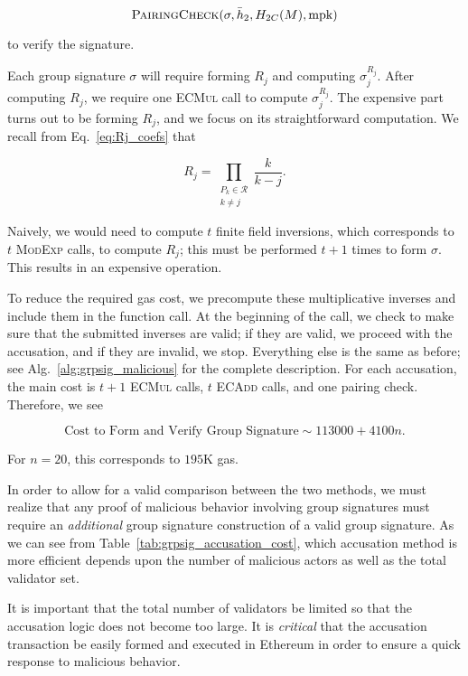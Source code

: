 \begin{equation}
    \textsc{PairingCheck}(\sigma, \bar{h}_{2}, H_{2C}(M), \text{mpk})
\end{equation}

\noindent
to verify the signature.

Each group signature $\sigma$ will require forming $R_{j}$
and computing $\sigma_{j}^{R_{j}}$.
After computing $R_{j}$, we require one \textsc{ECMul} call
to compute $\sigma_{j}^{R_{j}}$.
The expensive part turns out to be forming $R_{j}$,
and we focus on its straightforward computation.
We recall from Eq.~\eqref{eq:Rj_coefs} that

\begin{equation}
    R_{j} = \prod_{\substack{P_{k}\in\mathcal{R} \\ k\ne j}} \frac{k}{k-j}.
\end{equation}

\noindent
Naively, we would need to compute $t$ finite field inversions,
which corresponds to $t$ \textsc{ModExp} calls, to compute $R_{j}$;
this must be performed $t+1$ times to form $\sigma$.
This results in an expensive operation.

To reduce the required gas cost, we precompute these
multiplicative inverses and include them in the function call.
At the beginning of the call, we check to make sure that the submitted
inverses are valid; if they are valid, we proceed with the
accusation, and if they are invalid, we stop.
Everything else is the same as before;
see Alg.~\ref{alg:grpsig_malicious} for the complete description.
For each accusation, the main cost is $t+1$ \textsc{ECMul} calls,
$t$ \textsc{ECAdd} calls,
and one pairing check.
Therefore, we see

\begin{equation}
    \text{Cost to Form and Verify Group Signature} \sim 113000 + 4100n.
\end{equation}

\noindent
For $n=20$, this corresponds to $195$K gas.

In order to allow for a valid comparison between the two methods,
we must realize that any proof of malicious behavior involving
group signatures must require an \emph{additional} group signature
construction of a valid group signature.
As we can see from Table~\ref{tab:grpsig_accusation_cost},
which accusation method is more efficient depends upon
the number of malicious actors as well as the total validator set.

It is important that the total number of validators be limited
so that the accusation logic does not become too large.
It is \emph{critical} that the accusation transaction
be easily formed and executed in Ethereum in order to ensure
a quick response to malicious behavior.


